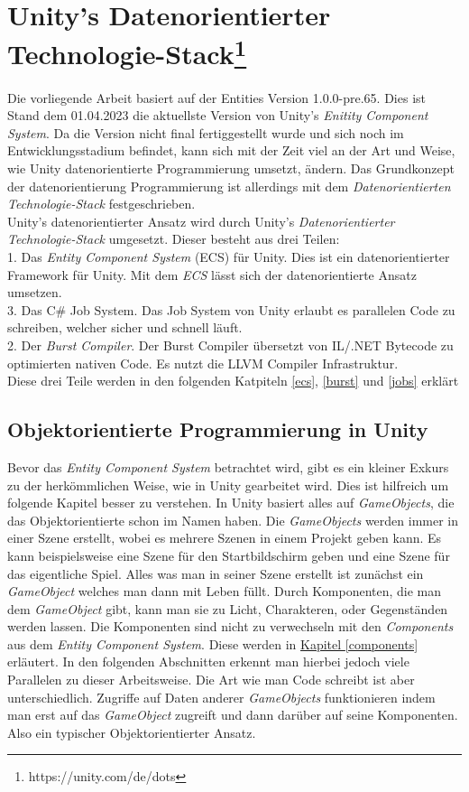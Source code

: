 \section{Unity's Datenorientierter Technologie-Stack\footnote{https://unity.com/de/dots}}
Die vorliegende Arbeit basiert auf der Entities Version 1.0.0-pre.65. Dies ist Stand dem 01.04.2023 die aktuellste Version von Unity's \textit{Enitity Component System}. Da die Version nicht final fertiggestellt wurde und sich noch im Entwicklungsstadium befindet, kann sich mit der Zeit viel an der Art und Weise, wie Unity datenorientierte Programmierung umsetzt, ändern. Das Grundkonzept der datenorientierung Programmierung ist allerdings mit dem \textit{Datenorientierten Technologie-Stack} festgeschrieben.\\
Unity's datenorientierter Ansatz wird durch Unity's \textit{Datenorientierter Technologie-Stack} umgesetzt. Dieser besteht aus drei Teilen:\\
1. Das \textit{Entity Component System} (ECS) für Unity. Dies ist ein datenorientierter Framework für Unity. Mit dem \textit{ECS} lässt sich der datenorientierte Ansatz umsetzen.\\
3. Das C\# Job System. Das Job System von Unity erlaubt es parallelen Code zu schreiben, welcher sicher und schnell läuft.\\
2. Der \textit{Burst Compiler}. Der Burst Compiler übersetzt von IL/.NET Bytecode zu optimierten nativen Code. Es nutzt die LLVM Compiler Infrastruktur.\\
Diese drei Teile werden in den folgenden Katpiteln \ref{ecs}, \ref{burst} und \ref{jobs} erklärt
\subsection{Objektorientierte Programmierung in Unity}
Bevor das \textit{Entity Component System} betrachtet wird, gibt es ein kleiner Exkurs zu der herkömmlichen Weise, wie in Unity gearbeitet wird. Dies ist hilfreich um folgende Kapitel besser zu verstehen. In Unity basiert alles auf \textit{GameObjects}, die das Objektorientierte schon im Namen haben. Die \textit{GameObjects} werden immer in einer Szene erstellt, wobei es mehrere Szenen in einem Projekt geben kann. Es kann beispielsweise eine Szene für den Startbildschirm geben und eine Szene für das eigentliche Spiel. Alles was man in seiner Szene erstellt ist zunächst ein \textit{GameObject} welches man dann mit Leben füllt. Durch Komponenten, die man dem \textit{GameObject} gibt, kann man sie zu Licht, Charakteren, oder Gegenständen werden lassen. Die Komponenten sind nicht zu verwechseln mit den \textit{Components} aus dem \textit{Entity Component System}. Diese werden in \hyperref[components]{Kapitel \ref{components}} erläutert. In den folgenden Abschnitten erkennt man hierbei jedoch viele Parallelen zu dieser Arbeitsweise. Die Art wie man Code schreibt ist aber unterschiedlich. Zugriffe auf Daten anderer \textit{GameObjects} funktionieren indem man erst auf das \textit{GameObject} zugreift und dann darüber auf seine Komponenten. Also ein typischer Objektorientierter Ansatz.


